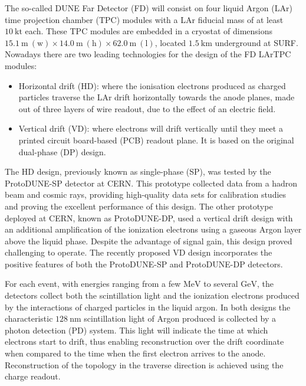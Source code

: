 The so-called DUNE Far Detector (FD) will consist on four liquid Argon (LAr) time projection chamber (TPC) modules with a LAr fiducial mass of at least $10 \ \mathrm{kt}$ each. These TPC modules are embedded in a cryostat of dimensions $15.1 \ \mathrm{m} \ (\text{w}) \times 14.0 \ \mathrm{m} \ (\text{h}) \times 62.0 \ \mathrm{m} \ (\text{l})$, located $1.5 \ \mathrm{km}$ underground at SURF. Nowadays there are two leading technologies for the design of the FD LArTPC modules:
\begin{itemize}
	\item Horizontal drift (HD): where the ionisation electrons produced as charged particles traverse the LAr drift horizontally towards the anode planes, made out of three layers of wire readout, due to the effect of an electric field. 
	\item Vertical drift (VD): where electrons will drift vertically until they meet a printed circuit board-based (PCB) readout plane. It is based on the original dual-phase (DP) design.
\end{itemize}
The HD design, previously known as single-phase (SP), was tested by the ProtoDUNE-SP detector at CERN. This prototype collected data from a hadron beam and cosmic rays, providing high-quality data sets for calibration studies and proving the excellent performance of this design. The other prototype deployed at CERN, known as ProtoDUNE-DP, used a vertical drift design with an additional amplification of the ionization electrons using a gaseous Argon layer above the liquid phase. Despite the advantage of signal gain, this design proved challenging to operate. The recently proposed VD design incorporates the positive features of both the ProtoDUNE-SP and ProtoDUNE-DP detectors.

For each event, with energies ranging from a few $\mathrm{MeV}$ to several $\mathrm{GeV}$, the detectors collect both the scintillation light and the ionization electrons produced by the interactions of charged particles in the liquid argon. In both designs the characteristic $128 \ \mathrm{nm}$ scintillation light of Argon produced is collected by a photon detection (PD) system. This light will indicate the time at which electrons start to drift, thus enabling reconstruction over the drift coordinate when compared to the time when the first electron arrives to the anode. Reconstruction of the topology in the traverse direction is achieved using the charge readout.

